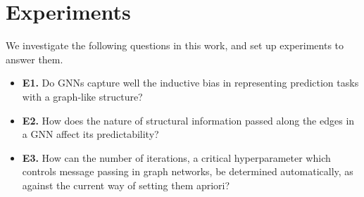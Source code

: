 \section{Experiments}
\label{sec:experiments}
We investigate the following questions in this work, and set up experiments to answer them.

\begin{itemize}[noitemsep,topsep=0pt]
	\item \textbf{E1.} Do GNNs capture well the inductive bias in representing prediction tasks with a graph-like structure?
	\item \textbf{E2.} How does the nature of structural information passed along the edges in a GNN affect its predictability?
	\item \textbf{E3.} How can the number of iterations, a critical hyperparameter which controls message passing in graph networks, be determined automatically, as against the current way of setting them apriori?
\end{itemize}

